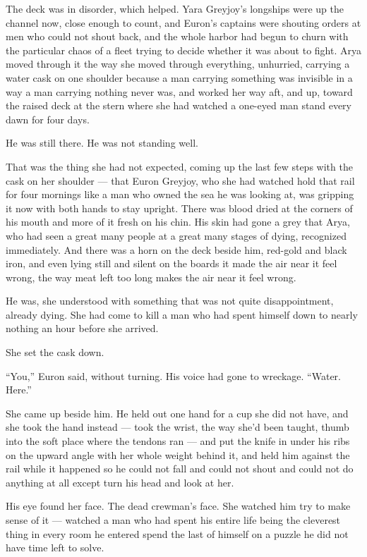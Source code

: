 The deck was in disorder, which helped. Yara Greyjoy’s longships were up the channel now, close enough to count, and Euron’s captains were shouting orders at men who could not shout back, and the whole harbor had begun to churn with the particular chaos of a fleet trying to decide whether it was about to fight. Arya moved through it the way she moved through everything, unhurried, carrying a water cask on one shoulder because a man carrying something was invisible in a way a man carrying nothing never was, and worked her way aft, and up, toward the raised deck at the stern where she had watched a one-eyed man stand every dawn for four days.

He was still there. He was not standing well.

That was the thing she had not expected, coming up the last few steps with the cask on her shoulder — that Euron Greyjoy, who she had watched hold that rail for four mornings like a man who owned the sea he was looking at, was gripping it now with both hands to stay upright. There was blood dried at the corners of his mouth and more of it fresh on his chin. His skin had gone a grey that Arya, who had seen a great many people at a great many stages of dying, recognized immediately. And there was a horn on the deck beside him, red-gold and black iron, and even lying still and silent on the boards it made the air near it feel wrong, the way meat left too long makes the air near it feel wrong.

He was, she understood with something that was not quite disappointment, already dying. She had come to kill a man who had spent himself down to nearly nothing an hour before she arrived.

She set the cask down.

“You,” Euron said, without turning. His voice had gone to wreckage. “Water. Here.”

She came up beside him. He held out one hand for a cup she did not have, and she took the hand instead — took the wrist, the way she’d been taught, thumb into the soft place where the tendons ran — and put the knife in under his ribs on the upward angle with her whole weight behind it, and held him against the rail while it happened so he could not fall and could not shout and could not do anything at all except turn his head and look at her.

His eye found her face. The dead crewman’s face. She watched him try to make sense of it — watched a man who had spent his entire life being the cleverest thing in every room he entered spend the last of himself on a puzzle he did not have time left to solve.

